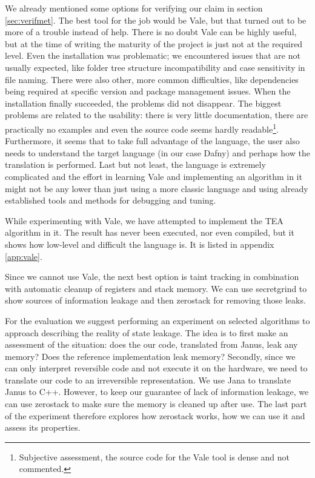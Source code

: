 \documentclass[a4paper,10pt,openright]{memoir}
\begin{document}
We already mentioned some options for verifying our claim in section 
\ref{sec:verifmet}. The best tool for the job would be Vale, but that 
turned out to be more of a trouble instead of help. There is no doubt 
Vale can be highly useful, but at the time of writing the maturity of 
the project is just not at the required level. Even the installation 
was problematic; we encountered issues that are not usually expected, 
like folder tree structure incompatibility and case sensitivity in file 
naming. There were also other, more common difficulties, like 
dependencies being required at specific version and package management 
issues. When the installation finally succeeded, the problems did not 
disappear. The biggest problems are related to the usability: there is 
very little documentation, there are practically no examples and even 
the source code seems hardly readable\footnote{Subjective assessment, 
the source code for the Vale tool is dense and not commented.}. 
Furthermore, it seems that to take full advantage of the language, the 
user also needs to understand the target language (in our case Dafny) 
and perhaps how the translation is performed. Last but not least, the 
language is extremely complicated and the effort in learning Vale and 
implementing an algorithm in it might not be any lower than just using 
a more classic language and using already established tools and methods 
for debugging and tuning.

While experimenting with Vale, we have attempted to implement the TEA 
algorithm in it. The result has never been executed, nor even compiled, 
but it shows how low-level and difficult the language is. It is listed 
in appendix \ref{app:vale}.

Since we cannot use Vale, the next best option is taint tracking in 
combination with automatic cleanup of registers and stack memory. We 
can use secretgrind to show sources of information leakage and then 
zerostack for removing those leaks.

For the evaluation we suggest performing an experiment on selected 
algorithms to approach describing the reality of state leakage. The 
idea is to first make an assessment of the situation: does the our 
code, translated from Janus, leak any memory? Does the reference 
implementation leak memory? Secondly, since we can only interpret 
reversible code and not execute it on the hardware, we need to 
translate our code to an irreversible representation. We use Jana to 
translate Janus to C++. However, to keep our guarantee of lack of 
information leakage, we can use zerostack to make sure the memory is 
cleaned up after use. The last part of the experiment therefore 
explores how zerostack works, how we can use it and assess its 
properties.
\end{document}
